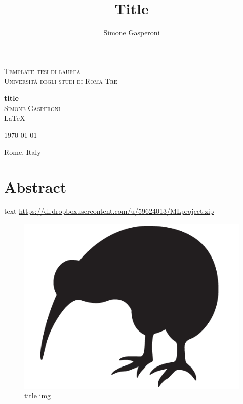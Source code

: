 \documentclass[a4paper]{article}
\author{Simone Gasperoni}
\title{Title}
\begin{document}
\begin{titlepage}
\begin{center}

\textsc{Template tesi di laurea}\\[0.5cm]
\textsc{Università degli studi di Roma Tre}\\[0.5cm]

\hrulefill

{ \huge \bfseries title \\[0.4cm] }
\textsc{\Large Simone Gasperoni}\\[0.5cm]
\vfill
\LaTeX

\today

Rome, Italy
\end{center}
\end{titlepage}


\maketitle
\tableofcontents
\newpage

\section{Abstract}
text
\url{https://dl.dropboxusercontent.com/u/59624013/MLproject.zip}
\begin{figure}[htbp]
\begin{center}
\includegraphics[scale=0.5]{kiwi.png}
\caption{title img}
\end{center}
\end{figure}
\end{document}

